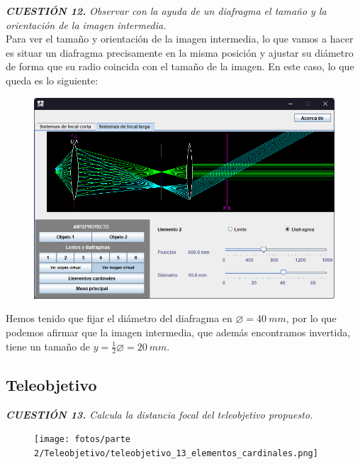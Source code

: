 \documentclass[11pt]{article}
\begin{document}
    \vspace{0.6cm}
    \textit{\textbf{CUESTIÓN 12.} Observar con la ayuda de un diafragma el tamaño y la orientación de la imagen intermedia.}
    \\
    
    \noindent Para ver el tamaño y orientación de la imagen intermedia, lo que vamos a hacer es situar un diafragma precisamente en la misma posición y ajustar su diámetro de forma que su radio coincida con el tamaño de la imagen. En este caso, lo que queda es lo siguiente:
    \begin{figure}[ht]
        \centering
        \includegraphics[scale=0.45]{fotos/parte 2/Microscopio/microscopio_10_tamaño_imagen.png}
        \label{fig:microscopio_10_tamañoimagen}
    \end{figure}
    
    \noindent Hemos tenido que fijar el diámetro del diafragma en $\varnothing = 40\ mm$, por lo que podemos afirmar que la imagen intermedia, que además encontramos invertida, tiene un tamaño de $y = \frac12 \varnothing = 20\ mm$.  

    \clearpage
    \subsection{Teleobjetivo}
    \textit{\textbf{CUESTIÓN 13.} Calcula la distancia focal del teleobjetivo propuesto.}
    \\

    \begin{figure}
        \vspace{-0.7cm}
        \centering
        \texttt{[image: fotos/parte 2/Teleobjetivo/teleobjetivo\_13\_elementos\_cardinales.png]}
    \end{figure}
    
\end{document}
